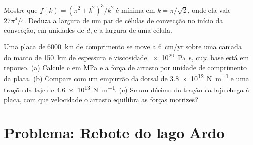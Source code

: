 \begin{exercise}[$\star\star\star$]\label{exo:b3:mantle-convection:11}
Mostre que $f(k) = (\pi^2 + k^2)^3/k^2$ é mínima em $k = \pi/\sqrt2$, onde
ela vale $27\pi^4/4$. Deduza a largura de um par de células de convecção no início
da convecção, em unidades de $d$, e a largura de uma célula.
\end{exercise}

\begin{exercise}[$\star\star\star$]\label{exo:b3:mantle-convection:12}
Uma placa de \qty{6000}{km} de comprimento se move a \qty{6}{cm/yr} sobre uma camada do manto
de \qty{150}{km} de espessura e viscosidade \qty{e20}{Pa.s}, cuja base está em repouso. (a)
Calcule o  em \unit{MPa} e a força de arrasto por unidade de comprimento da placa.
(b) Compare com um empurrão da dorsal de \qty{3.8e12}{N.m^{-1}} e uma tração da laje de
\qty{4.6e13}{N.m^{-1}}. (c) Se um décimo da tração da laje chega à placa,
com que velocidade o arrasto equilibra as forças motrizes?
\end{exercise}

\section{Problema: Rebote do lago Ardo}

